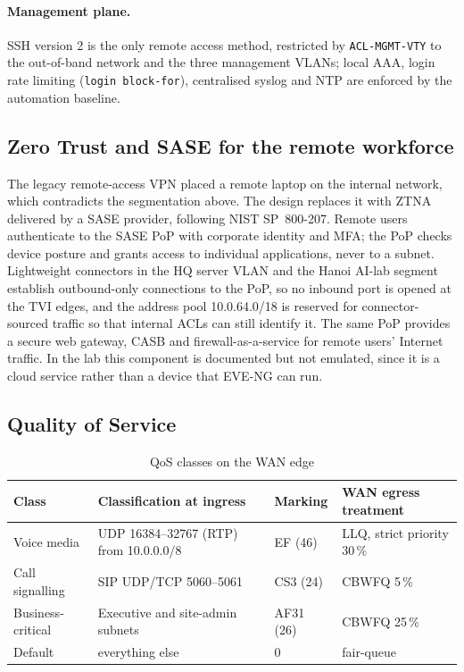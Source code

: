 \documentclass[11pt,a4paper]{article}
\begin{document}


\paragraph{Management plane.} SSH version 2 is the only remote access method, restricted by \texttt{ACL-MGMT-VTY} to the out-of-band network and the three management VLANs; local AAA, login rate limiting (\texttt{login block-for}), centralised syslog and NTP are enforced by the automation baseline.

\subsection{Zero Trust and SASE for the remote workforce}
\label{sec:ztna}

The legacy remote-access VPN placed a remote laptop on the internal network, which contradicts the segmentation above. The design replaces it with ZTNA delivered by a SASE provider, following NIST SP~800-207. Remote users authenticate to the SASE PoP with corporate identity and MFA; the PoP checks device posture and grants access to individual applications, never to a subnet. Lightweight connectors in the HQ server VLAN and the Hanoi AI-lab segment establish outbound-only connections to the PoP, so no inbound port is opened at the TVI edges, and the address pool 10.0.64.0/18 is reserved for connector-sourced traffic so that internal ACLs can still identify it. The same PoP provides a secure web gateway, CASB and firewall-as-a-service for remote users' Internet traffic. In the lab this component is documented but not emulated, since it is a cloud service rather than a device that EVE-NG can run.

\subsection{Quality of Service}
\label{sec:qos}

\begin{table}[H]
\centering\small
\caption{QoS classes on the WAN edge}
\label{tab:qos}
\begin{tabular}{@{}l l l l@{}}
\toprule
\textbf{Class} & \textbf{Classification at ingress} & \textbf{Marking} & \textbf{WAN egress treatment}\\
\midrule
Voice media & UDP 16384--32767 (RTP) from 10.0.0.0/8 & EF (46) & LLQ, strict priority 30\,\%\\
Call signalling & SIP UDP/TCP 5060--5061 & CS3 (24) & CBWFQ 5\,\%\\
Business-critical & Executive and site-admin subnets & AF31 (26) & CBWFQ 25\,\%\\
Default & everything else & 0 & fair-queue\\
\bottomrule
\end{tabular}
\end{table}
\end{document}
